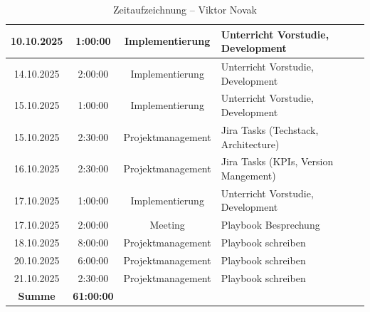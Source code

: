 \documentclass{article}
\begin{document}
\begin{table}[H]
\begin{tabularx}{\textwidth}{|c|c|c|X|}
    10.10.2025 & 1:00:00 & Implementierung   & Unterricht Vorstudie, Development \\ \hline
    14.10.2025 & 2:00:00 & Implementierung   & Unterricht Vorstudie, Development \\ \hline
    15.10.2025 & 1:00:00 & Implementierung   & Unterricht Vorstudie, Development \\ \hline
    15.10.2025 & 2:30:00 & Projektmanagement & Jira Tasks (Techstack, Architecture) \\ \hline
    16.10.2025 & 2:30:00 & Projektmanagement & Jira Tasks (KPIs, Version Mangement) \\ \hline
    17.10.2025 & 1:00:00 & Implementierung   & Unterricht Vorstudie, Development \\ \hline
    17.10.2025 & 2:00:00 & Meeting           & Playbook Besprechung \\ \hline
    18.10.2025 & 8:00:00 & Projektmanagement & Playbook schreiben \\ \hline
    20.10.2025 & 6:00:00 & Projektmanagement & Playbook schreiben \\ \hline
    21.10.2025 & 2:30:00 & Projektmanagement & Playbook schreiben \\ \hline
    \rowcolor{black!10}\textbf{Summe} & \textbf{61:00:00} & & \\ \hline
  \end{tabularx}
  \caption{Zeitaufzeichnung – Viktor Novak}
  \label{tab:zeit-viktor}
\end{table}
\end{document}
